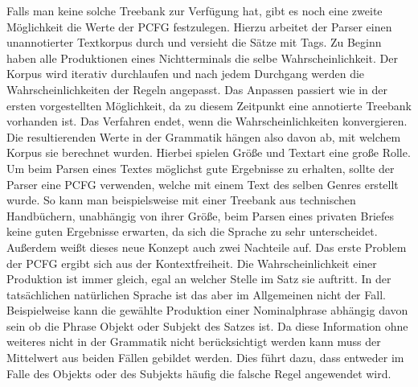 Falls man keine solche Treebank zur Verfügung hat, gibt es noch eine zweite Möglichkeit die Werte der PCFG festzulegen. Hierzu arbeitet der Parser einen unannotierter Textkorpus durch und versieht die Sätze mit Tags. Zu Beginn haben alle Produktionen eines Nichtterminals die selbe Wahrscheinlichkeit. Der Korpus wird iterativ durchlaufen und nach jedem Durchgang werden die Wahrscheinlichkeiten der Regeln angepasst. Das Anpassen passiert wie in der ersten vorgestellten Möglichkeit, da zu diesem Zeitpunkt eine annotierte Treebank vorhanden ist. Das Verfahren endet, wenn die Wahrscheinlichkeiten konvergieren. \\
Die resultierenden Werte in der Grammatik hängen also davon ab, mit welchem Korpus sie berechnet wurden. Hierbei spielen Größe und Textart eine große Rolle. Um beim Parsen eines Textes möglichst gute Ergebnisse zu erhalten, sollte der Parser eine PCFG verwenden, welche mit einem Text des selben Genres erstellt wurde. So kann man beispielsweise mit einer Treebank aus technischen Handbüchern, unabhängig von ihrer Größe, beim Parsen eines privaten Briefes keine guten Ergebnisse erwarten, da sich die Sprache zu sehr unterscheidet.\\ %
Außerdem weißt dieses neue Konzept auch zwei Nachteile auf.
Das erste Problem der PCFG ergibt sich aus der Kontextfreiheit. Die Wahrscheinlichkeit einer Produktion ist immer gleich, egal an welcher Stelle im Satz sie auftritt. In der tatsächlichen natürlichen Sprache ist das aber im Allgemeinen nicht der Fall. Beispielweise kann die gewählte Produktion einer Nominalphrase abhängig davon sein ob die Phrase Objekt oder Subjekt des Satzes ist. Da diese Information ohne weiteres nicht in der Grammatik nicht berücksichtigt werden kann muss der Mittelwert aus beiden Fällen gebildet werden. Dies führt dazu, dass entweder im Falle des Objekts oder des Subjekts häufig die falsche Regel angewendet wird. \\
